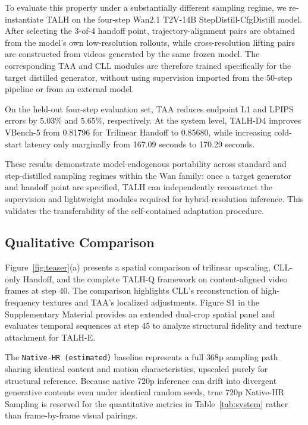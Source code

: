 To evaluate this property under a substantially different
sampling regime, we re-instantiate TALH on the four-step Wan2.1
T2V-14B StepDistill-CfgDistill model. After selecting the
3-of-4 handoff point, trajectory-alignment pairs are obtained from
the model's own low-resolution rollouts, while cross-resolution
lifting pairs are constructed from videos generated by the same
frozen model. The corresponding TAA and CLL modules are therefore
trained specifically for the target distilled generator, without
using supervision imported from the 50-step pipeline or from an
external model.

On the held-out four-step evaluation set, TAA reduces endpoint
L1 and LPIPS errors by 5.03\% and 5.65\%, respectively. At the
system level, TALH-D4 improves VBench-5 from 0.81796 for
Trilinear Handoff to 0.85680, while increasing cold-start latency
only marginally from 167.09 seconds to 170.29 seconds.

These results demonstrate model-endogenous portability across
standard and step-distilled sampling regimes within the Wan
family: once a target generator and handoff point are specified,
TALH can independently reconstruct the supervision and
lightweight modules required for hybrid-resolution inference.
This validates the transferability of the self-contained adaptation procedure.

\subsection{Qualitative Comparison}

Figure~\ref{fig:teaser}(a) presents a spatial comparison of trilinear upscaling,
CLL-only Handoff, and the complete TALH-Q framework on content-aligned
video frames at step 40. The comparison highlights CLL's reconstruction
of high-frequency textures and TAA's localized adjustments. Figure S1 in
the Supplementary Material provides an extended dual-crop spatial panel
and evaluates temporal sequences at step 45 to analyze structural
fidelity and texture attachment for TALH-E.

The \texttt{Native-HR\ (estimated)} baseline represents a full
\(368\text{p}\) sampling path sharing identical content and motion
characteristics, upscaled purely for structural reference. Because
native \(720\text{p}\) inference can drift into divergent generative
contents even under identical random seeds, true \(720\text{p}\)
Native-HR Sampling is reserved for the quantitative metrics in Table~\ref{tab:system}
rather than frame-by-frame visual pairings.


